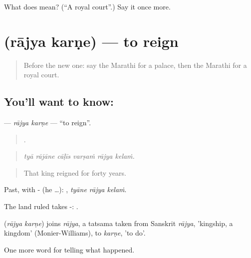 \begin{tcolorbox}[breakable,colback=teal!4,colframe=teal!35!black,title={Before you move on}]
What does  mean? (\textquotedblleft{}A royal court\textquotedblright{}.) Say it once more.
\end{tcolorbox}
\section[\texorpdfstring{\mr{राज्य} \mr{करणे} (rājya karṇe)}{राज्य करणे (rājya karṇe)}]{  (rājya karṇe) — to reign}

\label{lesson:MR-C325-rajya-karne}



\begin{quote}
Before the new one: say the Marathi for a palace, then the Marathi for a royal court.
\end{quote}

\subsection*{You'll want to know:  }
\textbf{ } — \emph{rājya karṇe} — \textquotedblleft{}to reign\textquotedblright{}.

\begin{quote}
     .
\end{quote}

\begin{quote}
\emph{tyā rājāne cāḷīs varṣaṁ rājya kelaṁ.}
\end{quote}

\begin{quote}
That king reigned for forty years.
\end{quote}

Past, with - (he …):   , \emph{tyāne rājya kelaṁ}.

The land ruled takes -:   .

\begin{cousinweb}
\textbf{ } (\emph{rājya karṇe}) joins \emph{rājya}, a tatsama taken from Sanskrit \emph{rājya}, 'kingship, a kingdom' (Monier-Williams), to \emph{karṇe}, 'to do'.
\end{cousinweb}

\begin{grammarlens}[title={What you've built}]
One more word for telling what happened.
\end{grammarlens}

